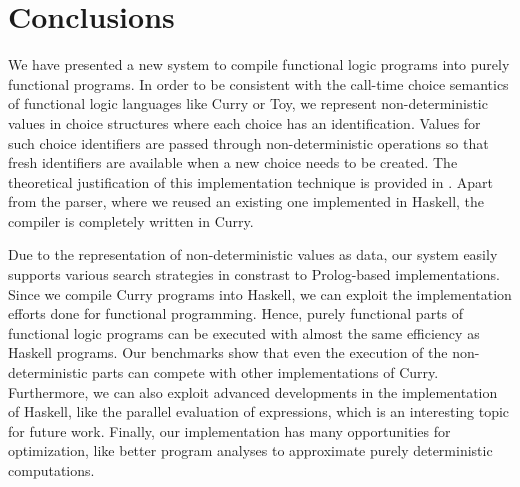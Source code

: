 \documentclass{llncs}
\begin{document}
\section{Conclusions}
\label{sec:Conclusions}

We have presented a new system to compile functional logic programs
into purely functional programs.
In order to be consistent with the call-time choice semantics
of functional logic languages like Curry or Toy,
we represent non-deterministic values
in choice structures where each choice has an identification.
Values for such choice identifiers are passed through
non-deterministic operations so that fresh identifiers are available
when a new choice needs to be created.
The theoretical justification of this implementation technique
is provided in \cite{Brassel11Thesis}.
Apart from the parser, where we reused an existing one
implemented in Haskell, the compiler is completely written in Curry.

Due to the representation of non-deterministic values as data,
our system easily supports various search strategies
in constrast to Prolog-based implementations.
Since we compile Curry programs into Haskell,
we can exploit the implementation efforts done
for functional programming.
Hence, purely functional parts of functional logic programs
can be executed with almost the same efficiency as Haskell programs.
Our benchmarks show that even the execution of the
non-deterministic parts can compete with other
implementations of Curry.
Furthermore, we can also exploit advanced developments
in the implementation of Haskell, like the parallel evaluation of
expressions, which is an interesting topic for future work.
Finally, our implementation has many opportunities
for optimization, like
better program analyses to approximate purely deterministic computations.



\end{document}
